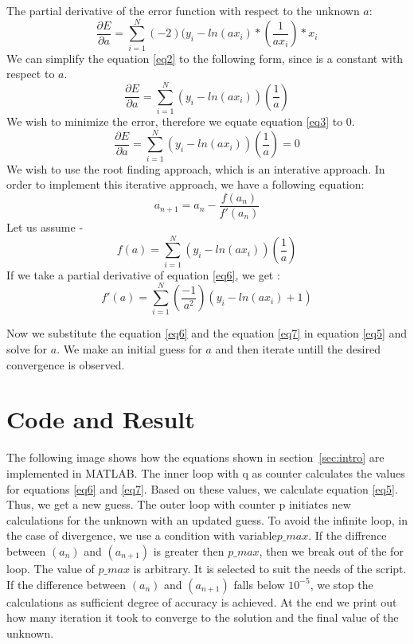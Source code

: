 \documentclass{article}
\begin{document}
The partial derivative of the error function with respect to the unknown $a$:
\begin{equation}\label{eq2}
 \frac{\partial E}{\partial a} = \sum_{i=1}^N (-2)(y_i - ln(ax_i) * (\frac{1}{ax_i}) * x_i
\end{equation}
We can simplify the equation \ref{eq2} to the following form, since  is a constant with respect to $a$.
\begin{equation}\label{eq3}
\frac{\partial E}{\partial a} = \sum_{i=1}^{N}(y_i - ln(ax_i))(\frac{1}{a})
\end{equation}         
We wish to minimize the error, therefore we equate equation \ref{eq3} to 0.
 \begin{equation}\label{eq4}
\frac{\partial E}{\partial a} = \sum_{i=1}^{N}(y_i - ln(ax_i))(\frac{1}{a}) = 0
\end{equation}
We wish to use the root finding approach, which is an interative approach. In order to implement this iterative approach, we have a following equation:
\begin{equation}\label{eq5}
a_{n+1} = a_{n} - \frac{f(a_n)}{f'(a_n)}
\end{equation}
Let us assume -   
\begin{equation}\label{eq6}
f(a) = \sum_{i=1}^{N}(y_i - ln(ax_i))(\frac{1}{a})
\end{equation}
If we take a partial derivative of equation \ref{eq6}, we get :
\begin{equation}\label{eq7}
f'(a) = \sum_{i=1}^{N}(\frac{-1}{a^2})(y_i - ln(ax_i)+1)
\end{equation}

Now we substitute the equation \ref{eq6} and the equation \ref{eq7} in equation \ref{eq5} and solve for $a$. We make an initial guess for $a$ and then iterate untill the desired convergence is observed. \\
\newpage


\section{\centering Code and Result}\label{sec:code}

The following image shows  how the equations shown in section~\ref{sec:intro} are implemented in MATLAB. The inner loop with q as counter calculates the values for equations \ref{eq6} and \ref{eq7}. Based on these values, we calculate equation \ref{eq5}. Thus, we get a new guess. The outer loop with counter p initiates new calculations for the unknown with an updated guess. To avoid the infinite loop, in the case of divergence, we use a condition with variable$ p\_max$. If the diffrence between $(a_n)$ and $(a_{n+1})$ is greater then $p\_max$, then we break out of the for loop. The value of $p\_max$ is arbitrary. It is selected to suit the needs of the script. If the difference between  $(a_n)$ and $(a_{n+1})$ falls below $10^{-5}$, we stop the calculations as sufficient degree of accuracy is achieved. At the end we print out how many iteration it took to converge to the solution and the final value of the unknown.
\end{document}
